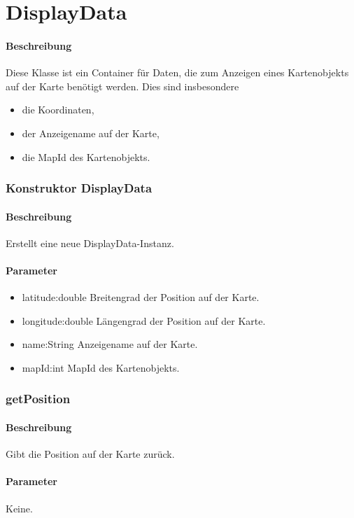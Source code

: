 \section{DisplayData}
\paragraph*{Beschreibung}
Diese Klasse ist ein Container für Daten, die zum Anzeigen eines Kartenobjekts auf der 
Karte benötigt werden. Dies sind insbesondere
\begin{itemize}
    \item die Koordinaten,
    \item der Anzeigename auf der Karte,
    \item die MapId des Kartenobjekts.
\end{itemize}

\subsubsection{Konstruktor DisplayData}%
\paragraph*{Beschreibung}
Erstellt eine neue DisplayData-Instanz.
\paragraph*{Parameter}
\begin{itemize}
    \item latitude:double Breitengrad der Position auf der Karte.
    \item longitude:double Längengrad der Position auf der Karte.
    \item name:String Anzeigename auf der Karte.
    \item mapId:int MapId des Kartenobjekts.
\end{itemize}

\subsubsection{getPosition}%
\paragraph*{Beschreibung}
Gibt die Position auf der Karte zurück.
\paragraph*{Parameter}
Keine.
